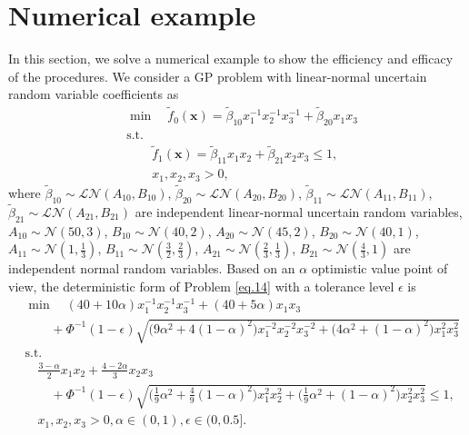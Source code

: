 \section{Numerical example}\label{sec.5} 
In this section, we solve a numerical example to show the efficiency and efficacy of the procedures. We consider a GP problem with linear-normal uncertain random variable coefficients as 
\begin{equation}\label{eq.14}
	\begin{aligned}
		&	\min \quad \tilde{f}_0(\textbf{x})=\tilde{\beta}_{10}x_1^{-1} x_2^{-1}x_3^{-1}+\tilde{\beta}_{20}x_1 x_3\\
		&	\text{s.t.} \\
		&\qquad \tilde{f}_1(\textbf{x})= \tilde{\beta}_{11}x_1 x_2+\tilde{\beta}_{21}x_2 x_3\leq 1,\\
		&\qquad	x_1,x_2,x_3>0,
	\end{aligned}
\end{equation}
where $\tilde{\beta}_{10}\sim\mathcal{LN}(A_{10},B_{10})$, $\tilde{\beta}_{20}\sim\mathcal{LN}(A_{20},B_{20})$, $\tilde{\beta}_{11}\sim\mathcal{LN}(A_{11},B_{11})$, $\tilde{\beta}_{21}\sim\mathcal{LN}(A_{21},B_{21})$ are independent linear-normal uncertain random variables, $A_{10}\sim\mathcal{N}(50,3)$, $B_{10}\sim\mathcal{N}(40,2)$, $A_{20}\sim\mathcal{N}(45,2)$, $B_{20}\sim\mathcal{N}(40,1)$, $A_{11}\sim\mathcal{N}(1,\frac{1}{3})$, $B_{11}\sim\mathcal{N}(\frac{3}{2},\frac{2}{3})$, $A_{21}\sim\mathcal{N}(\frac{2}{3},\frac{1}{3})$, $B_{21}\sim\mathcal{N}(\frac{4}{3},1)$ are independent normal random variables. Based on an $\alpha$ optimistic value point of view, the deterministic form of Problem \ref{eq.14} with a tolerance level $\epsilon$ is
\begin{equation}\label{eq.15}
	\begin{aligned}
		&	\min\quad (40+10\alpha) x_1^{-1} x_2^{-1}x_3^{-1}+(40+5\alpha)x_1 x_3\\
		& \qquad+\Phi^{-1}(1-\epsilon)\sqrt{\big(9\alpha^2+4(1-\alpha)^2\big) x_1^{-2} x_2^{-2}x_3^{-2}+\big(4\alpha^2+(1-\alpha)^2\big)x_1^2 x_3^2}\\
		&	\text{s.t.} \\
		&\quad  \frac{3-\alpha}{2}x_1 x_2+\frac{4-2\alpha}{3}x_2 x_3\\
		&\qquad+\Phi^{-1}(1-\epsilon)\sqrt{\bigg(\frac{1}{9}\alpha^2+\frac{4}{9}(1-\alpha)^2\bigg)x_1^2 x_2^2+\bigg(\frac{1}{9}\alpha^2+(1-\alpha)^2\bigg)x_2^2 x_3^2}\leq 1,\\
		&\quad	x_1,x_2,x_3>0, \alpha\in(0,1), \epsilon \in (0,0.5].
	\end{aligned}
\end{equation} 
